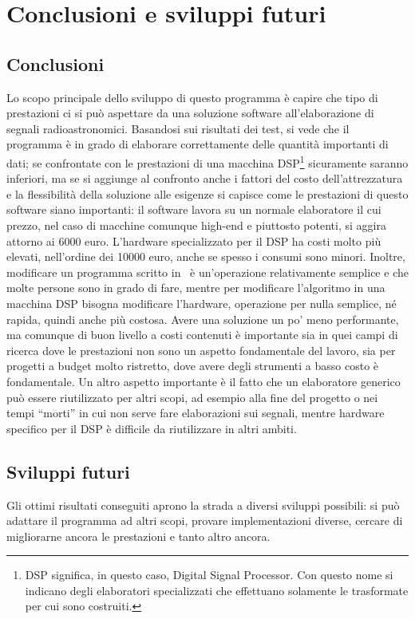 \chapter{Conclusioni e sviluppi futuri}
\label{conclusions}
\section{Conclusioni}
Lo scopo principale dello sviluppo di questo programma \`e capire che tipo di
prestazioni ci si pu\`o aspettare da una soluzione software all'elaborazione di
segnali radioastronomici. Basandosi sui risultati dei test, si vede che il
programma \`e in grado di elaborare correttamente delle quantit\`a importanti di
dati; se confrontate con le prestazioni di una macchina DSP\footnote{DSP
    significa, in questo caso, Digital Signal Processor. Con questo nome si
    indicano degli elaboratori specializzati che effettuano solamente le
    trasformate per cui sono costruiti.} sicuramente saranno inferiori, ma se si
aggiunge al confronto anche i fattori del costo dell'attrezzatura e la
flessibilit\`a della soluzione alle esigenze si capisce come le prestazioni di
questo software siano importanti: il software lavora su un normale elaboratore
il cui prezzo, nel caso di macchine comunque high-end e piuttosto potenti, si
aggira attorno ai 6000 euro. L'hardware specializzato per il DSP ha costi molto
pi\`u elevati, nell'ordine dei 10000 euro, anche se spesso i consumi sono
minori. Inoltre, modificare un programma scritto in \CC\, \`e un'operazione
relativamente semplice e che molte persone sono in grado di fare, mentre per
modificare l'algoritmo in una macchina DSP bisogna modificare l'hardware,
operazione per nulla semplice, n\'e rapida, quindi anche pi\`u costosa. Avere
una soluzione un po' meno performante, ma comunque di buon livello a costi
contenuti \`e importante sia in quei campi di ricerca dove le prestazioni non
sono un aspetto fondamentale del lavoro, sia per progetti a budget molto
ristretto, dove avere degli strumenti a basso costo \`e fondamentale.
Un altro aspetto importante \`e il fatto che un elaboratore generico pu\`o
essere riutilizzato per altri scopi, ad esempio alla fine del progetto o nei
tempi ``morti'' in cui non serve fare elaborazioni sui segnali, mentre hardware
specifico per il DSP \`e difficile da riutilizzare in altri ambiti.

\section{Sviluppi futuri}
Gli ottimi risultati conseguiti aprono la strada a diversi sviluppi possibili:
si può adattare il programma ad altri scopi, provare implementazioni diverse,
cercare di migliorarne ancora le prestazioni e tanto altro ancora.

